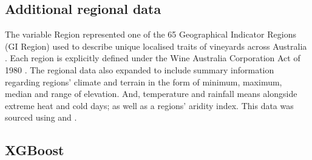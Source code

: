 \documentclass[review,12pt,authoryear]{elsarticle}
\begin{document}
\begin{linenumbers}
\subsection{Additional regional data}

The variable Region represented one of the 65 Geographical Indicator Regions (GI Region) used to describe unique localised traits of vineyards across Australia \citep{hallidayAustralianWineEncyclopedia2009,oliverReviewSoilPhysical2013,soarClimateDriversRed2008}. Each region is explicitly defined under the Wine Australia Corporation Act of 1980 \citep{attorney-generalsdepartmentWineAustraliaCorporation2010}. The regional data also expanded to include summary information regarding regions' climate and terrain in the form of minimum, maximum, median and range of elevation. And, temperature and rainfall means alongside extreme heat and cold days; as well as a regions' aridity index. This data was sourced using 
\cite{remenyiAustraliasWineFuture2019} and \cite{hallSpatialAnalysisClimate2010}.

\subsection{XGBoost}


\end{linenumbers}
\end{document}
